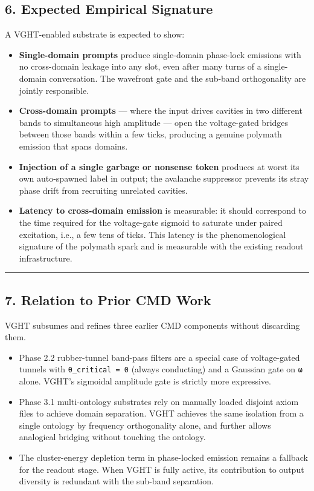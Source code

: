 \documentclass[
  11pt,
  a4paper,
]{article}
\providecommand{\tightlist}{%
  \setlength{\itemsep}{0pt}\setlength{\parskip}{0pt}}
\begin{document}
\subsection{6. Expected Empirical
Signature}\label{expected-empirical-signature}

A VGHT-enabled substrate is expected to show:

\begin{itemize}
\tightlist
\item
  \textbf{Single-domain prompts} produce single-domain phase-lock
  emissions with no cross-domain leakage into any slot, even after many
  turns of a single-domain conversation. The wavefront gate and the
  sub-band orthogonality are jointly responsible.
\item
  \textbf{Cross-domain prompts} --- where the input drives cavities in
  two different bands to simultaneous high amplitude --- open the
  voltage-gated bridges between those bands within a few ticks,
  producing a genuine polymath emission that spans domains.
\item
  \textbf{Injection of a single garbage or nonsense token} produces at
  worst its own auto-spawned label in output; the avalanche suppressor
  prevents its stray phase drift from recruiting unrelated cavities.
\item
  \textbf{Latency to cross-domain emission} is measurable: it should
  correspond to the time required for the voltage-gate sigmoid to
  saturate under paired excitation, i.e., a few tens of ticks. This
  latency is the phenomenological signature of the polymath spark and is
  measurable with the existing readout infrastructure.
\end{itemize}

\begin{center}\rule{0.5\linewidth}{0.5pt}\end{center}

\subsection{7. Relation to Prior CMD
Work}\label{relation-to-prior-cmd-work}

VGHT subsumes and refines three earlier CMD components without
discarding them.

\begin{itemize}
\tightlist
\item
  Phase 2.2 rubber-tunnel band-pass filters are a special case of
  voltage-gated tunnels with \texttt{θ\_critical\ =\ 0} (always
  conducting) and a Gaussian gate on \texttt{ω} alone. VGHT's sigmoidal
  amplitude gate is strictly more expressive.
\item
  Phase 3.1 multi-ontology substrates rely on manually loaded disjoint
  axiom files to achieve domain separation. VGHT achieves the same
  isolation from a single ontology by frequency orthogonality alone, and
  further allows analogical bridging without touching the ontology.
\item
  The cluster-energy depletion term in phase-locked emission remains a
  fallback for the readout stage. When VGHT is fully active, its
  contribution to output diversity is redundant with the sub-band
  separation.
\end{itemize}
\end{document}
